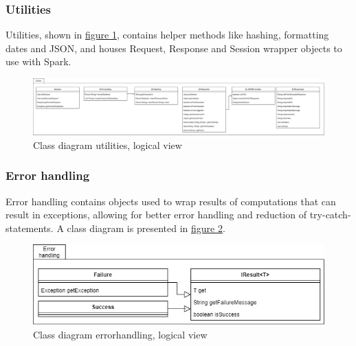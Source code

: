 \subsubsection{Utilities}
Utilities, shown in \hyperref[fig:classDiagramUtilities]{figure \ref{fig:classDiagramUtilities}}, contains helper methods like hashing, formatting dates and JSON, and houses Request, Response and Session wrapper objects to use with Spark.
\begin{figure}[H]
    \centering
    \includegraphics[width=1.0\textwidth]{images/class_diagram_utilities.jpg}
    \caption{Class diagram utilities, logical view}
    \label{fig:classDiagramUtilities}
\end{figure}

\subsubsection{Error handling}
Error handling contains objects used to wrap results of computations that can result in exceptions, allowing for better error handling and reduction of try-catch-statements. A class diagram is presented in  \hyperref[fig:classDiagramErrorhandling]{figure \ref{fig:classDiagramErrorhandling}}.
\begin{figure}[H]
    \centering
    \includegraphics[width=1.0\textwidth]{images/class_diagram_errorhandling.jpg}
    \caption{Class diagram errorhandling, logical view}
    \label{fig:classDiagramErrorhandling}
\end{figure}

